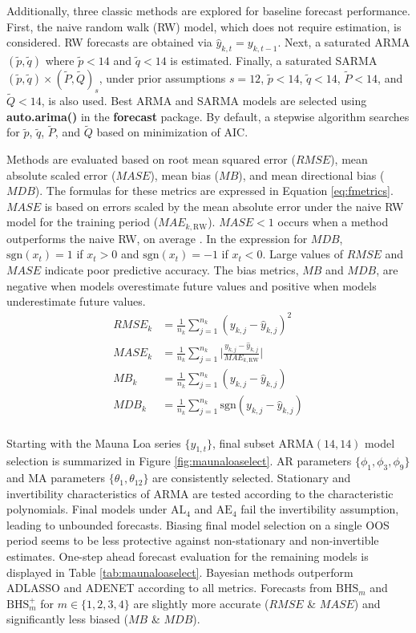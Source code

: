 Additionally, three classic methods are explored for baseline forecast performance. First, the naive random walk (RW) model, which does not require estimation, is considered. RW forecasts are obtained via $\hat{y}_{k,t}=y_{k,t-1}$. Next, a saturated ARMA$(\tilde{p},\tilde{q})$ where $\tilde{p}<14$ and $\tilde{q}<14$ is estimated. Finally, a saturated SARMA$(\tilde{p},\tilde{q})\times (\tilde{P},\tilde{Q})_s$, under prior assumptions $s=12$, $\tilde{p}<14$, $\tilde{q}<14$, $\tilde{P}<14$, and $\tilde{Q}<14$, is also used. Best ARMA and SARMA models are selected using {\bf auto.arima()} in the {\bf forecast} package. By default, a stepwise algorithm searches for $\tilde{p}$, $\tilde{q}$, $\tilde{P}$, and $\tilde{Q}$ based on minimization of AIC.

Methods are evaluated based on root mean squared error ($RMSE$), mean absolute scaled error ($MASE$), mean bias ($MB$), and mean directional bias ($MDB$). The formulas for these metrics are expressed in Equation \ref{eq:fmetrics}. $MASE$ is based on errors scaled by the mean absolute error under the naive RW model for the training period ($MAE_{k,\textrm{RW}}$). $MASE<1$ occurs when a method outperforms the naive RW, on average \citep{Hyndman2006}.   In the expression for $MDB$,  $\textrm{sgn}(x_t)=1$ if $x_t>0$ and $\textrm{sgn}(x_t)=-1$ if $x_t<0$. Large values of $RMSE$ and $MASE$ indicate poor predictive accuracy. The bias metrics, $MB$ and $MDB$, are negative when models overestimate future values and positive when models underestimate future values.
\begin{equation}
\label{eq:fmetrics}
\begin{split}
	RMSE_k&=\frac{1}{n_k} \sum\limits_{j=1}^{n_k} (y_{k,j}-\hat{y}_{k,j})^2 \\
	MASE_k&=\frac{1}{n_k} \sum\limits_{j=1}^{n_k} \Bigg|\frac{y_{k,j}-\hat{y}_{k,j}}{MAE_{k,\textrm{RW}}}\Bigg| \\
	MB_k&=\frac{1}{n_k} \sum\limits_{j=1}^{n_k} (y_{k,j}-\hat{y}_{k,j}) \\
	MDB_k&=\frac{1}{n_k} \sum\limits_{j=1}^{n_k} \textrm{sgn}(y_{k,j}-\hat{y}_{k,j})\\
\end{split}
\end{equation}


Starting with the Mauna Loa series $\{y_{1,t}\}$, final subset ARMA$(14,14)$ model selection is summarized in Figure \ref{fig:maunaloaselect}. AR parameters $\{\phi_1,\phi_3,\phi_9\}$ and MA parameters $\{\theta_1,\theta_{12}\}$ are consistently selected. Stationary and invertibility characteristics of ARMA are tested according to the characteristic polynomials. Final models under $\textrm{AL}_4$ and $\textrm{AE}_4$ fail the invertibility assumption, leading to unbounded forecasts. Biasing final model selection on a single OOS period seems to be less protective against non-stationary and non-invertible estimates.  One-step ahead forecast evaluation for the remaining models is displayed in Table \ref{tab:maunaloaselect}. Bayesian methods outperform ADLASSO and ADENET according to all metrics. Forecasts from $\textrm{BHS}_m$ and $\textrm{BHS}^+_m$ for $m\in\{1,2,3,4\}$ are slightly more accurate ($RMSE$ \& $MASE$) and significantly less biased ($MB$ \& $MDB$). 

